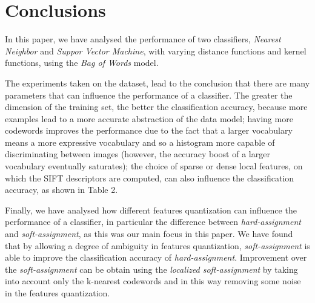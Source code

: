 \section{Conclusions}

In this paper, we have analysed the performance of two classifiers, \emph{Nearest Neighbor} and \emph{Suppor Vector Machine}, with varying distance functions and kernel functions, using the \emph{Bag of Words} model. 

The experiments taken on the dataset, lead to the conclusion that there are many parameters that can influence the performance of a classifier.
The greater the dimension of the training set, the better the classification accuracy, because more examples lead to a more accurate abstraction of the data model; having more codewords improves the performance due to the fact that a larger vocabulary means a more expressive vocabulary and so a histogram more capable of discriminating between images (however, the accuracy boost of a larger vocabulary eventually saturates); the choice of sparse or dense local features, on which the SIFT descriptors are computed, can also influence the classification accuracy, as shown in Table 2.

Finally, we have analysed how different features quantization can influence the performance of a classifier, in particular the difference between \emph{hard-assignment} and \emph{soft-assignment}, as this was our main focus in this paper.
We have found that by allowing a degree of ambiguity in features quantization, \emph{soft-assignment} is able to improve the classification accuracy of \emph{hard-assignment}. Improvement over the \emph{soft-assignment} can be obtain using the \emph{localized soft-assignment} by taking into account only the k-nearest codewords and in this way removing some noise in the features quantization.